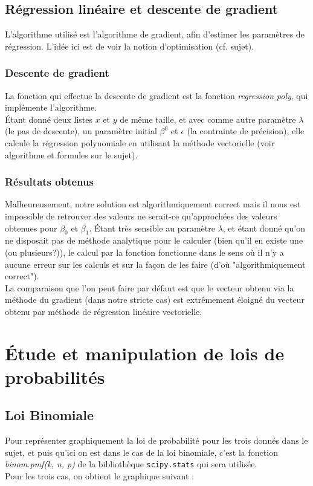 \documentclass{article}      %
\begin{document}
\subsection{Régression linéaire et descente de gradient}
L'algorithme utilisé est l'algorithme de gradient, afin d'estimer les paramètres de régression. L'idée ici est de voir la notion d'optimisation (cf. sujet).

\subsubsection{Descente de gradient}
La fonction qui effectue la descente de gradient est la fonction \textit{regression$\_$poly}, qui implémente l'algorithme.\\
Étant donné deux listes $x$ et $y$ de même taille, et avec comme autre paramètre $\lambda$ (le pas de descente), un paramètre initial $\beta^0$ et $\epsilon$ (la contrainte de précision), elle calcule la régression polynomiale en utilisant la méthode vectorielle (voir algorithme et formules sur le sujet).

\subsubsection{Résultats obtenus}
Malheureusement, notre solution est algorithmiquement correct mais il nous est impossible de retrouver des valeurs ne serait-ce qu'approchées des valeurs obtenues pour $\beta_0$ et $\beta_1$. Étant très sensible au paramètre $\lambda$, et étant donné qu'on ne disposait pas de méthode analytique pour le calculer (bien qu'il en existe une (ou plusieurs?)), le calcul par la fonction fonctionne dans le sens où il n'y a aucune erreur sur les calculs et sur la façon de les faire (d'où "algorithmiquement correct").\\
La comparaison que l'on peut faire par défaut est que le vecteur obtenu via la méthode du gradient (dans notre stricte cas) est extrêmement éloigné du vecteur obtenu par méthode de régression linéaire vectorielle.

\section{Étude et manipulation de lois de probabilités}
\subsection{Loi Binomiale}
Pour représenter graphiquement la loi de probabilité pour les trois donnés dans le sujet, et puis qu’ici on est dans le cas de la loi binomiale, c'est la fonction \textit{binom.pmf(k, n, p)} de la bibliothèque \texttt{scipy.stats} qui sera utilisée.\\
Pour les trois cas, on obtient le graphique suivant :\\
\end{document}
